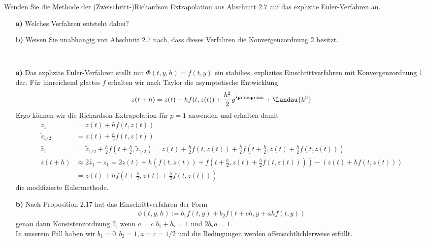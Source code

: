\begin{exercise}
Wenden Sie die Methode der (Zweischritt-)Richardson Extrapolation aus Abschnitt
2.7 auf das explizite Euler-Verfahren an.
\begin{itemize}
  \item [\textbf{a)}] Welches Verfahren entsteht dabei?
  \item [\textbf{b)}] Weisen Sie unabhängig von Abschnitt 2.7 nach, dass dieses
  Verfahren die Konvergenzordnung 2 besitzt.
\end{itemize}
\end{exercise}
\begin{solution}
\leavevmode \\
\begin{itemize}
  \item [\textbf{a)}] Das explizite Euler-Verfahren stellt mit
  $\Phi(t,y,h) = f(t,y)$ ein stabilies, explizites Einschrittverfahren
  mit Konvergenzordnung 1 dar.
  Für hinreichend glattes $f$ erhalten wir nach Taylor die asymptotische Entwicklung
  \begin{align*}
    z(t+h) = z(t) + hf(t,z(t)) + \frac{h^2}{2}y^{\primeprime} + \Landau{h^3}
  \end{align*}
  Ergo können wir die Richardson-Extrapolation für $p = 1$ anwenden und erhalten damit
  \begin{align*}
    z_1 &= z(t) + hf(t,z(t)) \\
    \widetilde{z}_{1/2} &= z(t) + \frac{h}{2}f(t,z(t)) \\
  \widetilde{z_1} &= \widetilde{z}_{1/2} + \frac{h}{2}f(t + \frac{h}{2},\widetilde{z}_{1/2})
  = z(t) + \frac{h}{2}f(t,z(t)) + \frac{h}{2}f(t + \frac{h}{2},z(t) + \frac{h}{2}f(t,z(t))) \\
    z(t + h) &\approx 2\widetilde{z_1} - z_1
    = 2z(t) + h\left(f(t,z(t))+ f(t+\frac{h}{2},z(t)+\frac{h}{2}f(t,z(t)))\right) -
    (z(t) + hf(t,z(t))) \\
    &= z(t) + hf(t+\frac{h}{2},z(t)+\frac{h}{2}f(t,z(t)))
  \end{align*}
  die modifizierte Eulermethode.
  \item [\textbf{b)}] Nach Proposition 2.17 hat das Einschrittverfahren der Form
  \begin{align*}
    \phi(t,y,h) := b_1f(t,y) + b_2f(t+ch,y+ahf(t,y))
  \end{align*}
  genau dann Konsistenzordnung 2, wenn $a = c$ $b_1 + b_2 = 1$ und $2b_2a = 1$. \\
  In unserem Fall haben wir $b_1 = 0, b_2 = 1, a = c = 1/2$ und die Bedingungen
  werden offensichtlichlerweise erfüllt.
\end{itemize}
\end{solution}

